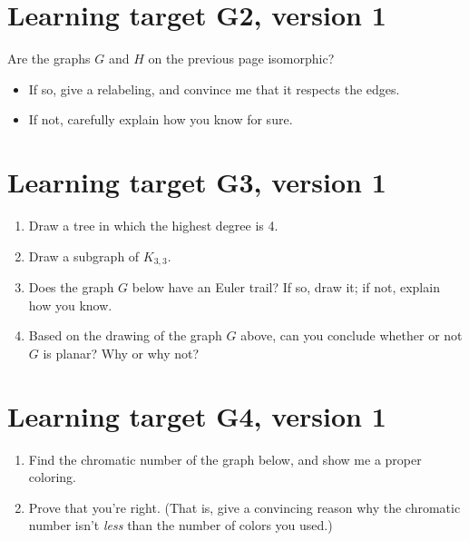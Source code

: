 \pagebreak
\section{Learning target G2, version 1}
Are the graphs $G$ and $H$ on the previous page isomorphic? 
\begin{itemize}
    \item If so, give a relabeling, and convince me that it respects the edges.
    \item If not, carefully explain how you know for sure.
\end{itemize}

\pagebreak
\section{Learning target G3, version 1}

\begin{enumerate}
    \item Draw a tree in which the highest degree is 4.
    
    \vfill
    \item Draw a subgraph of $K_{3,3}$.

    \vfill
    \item Does the graph $G$ below have an Euler trail? If so, draw it; if not, explain how you know.
    \item Based on the drawing of the graph $G$ above, can you conclude whether or not $G$ is planar? Why or why not?
\end{enumerate}

\pagebreak
\section{Learning target G4, version 1}
\begin{enumerate}
    \item Find the chromatic number of the graph below, and show me a proper coloring.
    \begin{center}
    \end{center}
    \item Prove that you're right. (That is, give a convincing reason why the chromatic number isn't \textit{less} than the number of colors you used.)
\end{enumerate}


